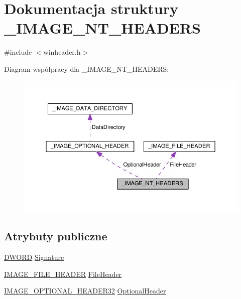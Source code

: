 \hypertarget{struct___i_m_a_g_e___n_t___h_e_a_d_e_r_s}{\section{Dokumentacja struktury \-\_\-\-I\-M\-A\-G\-E\-\_\-\-N\-T\-\_\-\-H\-E\-A\-D\-E\-R\-S}
\label{struct___i_m_a_g_e___n_t___h_e_a_d_e_r_s}
}


{\ttfamily \#include $<$winheader.\-h$>$}



Diagram współpracy dla \-\_\-\-I\-M\-A\-G\-E\-\_\-\-N\-T\-\_\-\-H\-E\-A\-D\-E\-R\-S\-:
\nopagebreak
\begin{figure}[H]
\begin{center}
\leavevmode
\includegraphics[width=350pt]{struct___i_m_a_g_e___n_t___h_e_a_d_e_r_s__coll__graph}
\end{center}
\end{figure}
\subsection*{Atrybuty publiczne}
\begin{DoxyCompactItemize}
\item 
\hyperlink{winheader_8h_af483253b2143078cede883fc3c111ad2}{D\-W\-O\-R\-D} \hyperlink{struct___i_m_a_g_e___n_t___h_e_a_d_e_r_s_a0fab671e499d3d3f47db0a30b8369f80}{Signature}
\item 
\hyperlink{winheader_8h_ab18994ab54fdb55d1542f30b3895ab10}{I\-M\-A\-G\-E\-\_\-\-F\-I\-L\-E\-\_\-\-H\-E\-A\-D\-E\-R} \hyperlink{struct___i_m_a_g_e___n_t___h_e_a_d_e_r_s_ab8aa7ee8ecc7b35fecc1b99b57fc9817}{File\-Header}
\item 
\hyperlink{winheader_8h_a3a446b0141b509f024b0238113b7f410}{I\-M\-A\-G\-E\-\_\-\-O\-P\-T\-I\-O\-N\-A\-L\-\_\-\-H\-E\-A\-D\-E\-R32} \hyperlink{struct___i_m_a_g_e___n_t___h_e_a_d_e_r_s_a71de2ed0819a8fac537db2e9daedfe05}{Optional\-Header}
\end{DoxyCompactItemize}


